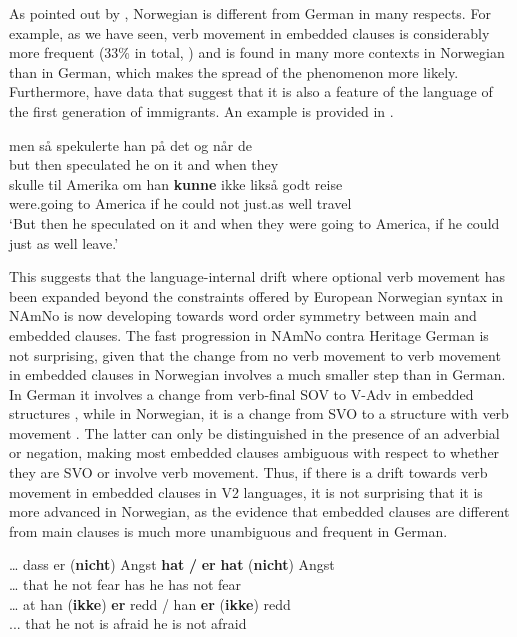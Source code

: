 \documentclass[output=paper]{langscibook}
\begin{document}
As pointed out by \citet{JensbergEtAl2024}, Norwegian is different from German in many respects. For example, as we have seen, verb movement in embedded clauses is considerably more frequent (33\% in total, \citealt{Ringstad2019}) and is found in many more contexts in Norwegian than in German, which makes the spread of the phenomenon more likely. Furthermore, \citet{JensbergEtAl2024} have data that suggest that it is also a feature of the language of the first generation of immigrants. An example is provided in .

\ea%
    \label{ex:anderssen:22}
\gll men så   spekulerte  han på det og når  de\\
     but then speculated  he  on it and when they \\
\gll skulle    til Amerika om han \textbf{kunne} ikke likså   godt reise\\
     were.going to America if    he   could   not  just.as well travel\\
\glt ‘But then he speculated on it and when they were going to America, if he could just as well leave.’
\z

This suggests that the language-internal drift where optional verb movement has been expanded beyond the constraints offered by European Norwegian syntax in NAmNo is now developing towards word order symmetry between main and embedded clauses. The fast progression in NAmNo contra Heritage German is not surprising, given that the change from no verb movement to verb movement in embedded clauses in Norwegian involves a much smaller step than in German. In German it involves a change from verb-final SOV to V-Adv in embedded structures , while in Norwegian, it is a change from SVO to a structure with verb movement . The latter can only be distinguished in the presence of an adverbial or negation, making most embedded clauses ambiguous with respect to whether they are SVO or involve verb movement. Thus, if there is a drift towards verb movement in embedded clauses in V2 languages, it is not surprising that it is more advanced in Norwegian, as the evidence that embedded clauses are different from main clauses is much more unambiguous and frequent in German. 

\ea%
    \label{ex:anderssen:23}
\ea \label{ex:anderssen:23a}
	\gll … dass   er (\textbf{nicht}) Angst \textbf{hat}  \textbf{/}   \textbf{er} \textbf{hat}  (\textbf{nicht}) Angst \\
         … that    he  not     fear    has {}   he has   not      fear \\
\ex  \label{ex:anderssen:23b}
	\gll … at      han (\textbf{ikke}) \textbf{er} redd  /  han \textbf{er} (\textbf{ikke}) redd\\
        ...  that   he    not     is afraid {}   he   is   not     afraid\\
\z
\z
\end{document}
